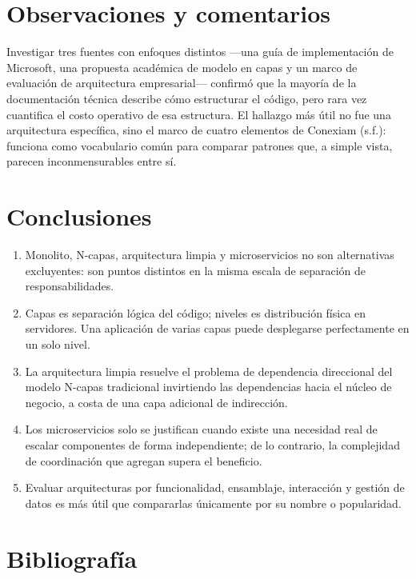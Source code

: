 \documentclass[
  spanish,
  12pt,
  letterpaper,
]{article}
\providecommand{\tightlist}{%
  \setlength{\itemsep}{0pt}\setlength{\parskip}{0pt}}
\begin{document}
\section{Observaciones y comentarios}\label{observaciones-y-comentarios}

Investigar tres fuentes con enfoques distintos ---una guía de
implementación de Microsoft, una propuesta académica de modelo en capas
y un marco de evaluación de arquitectura empresarial--- confirmó que la
mayoría de la documentación técnica describe cómo estructurar el código,
pero rara vez cuantifica el costo operativo de esa estructura. El
hallazgo más útil no fue una arquitectura específica, sino el marco de
cuatro elementos de Conexiam (s.f.): funciona como vocabulario común
para comparar patrones que, a simple vista, parecen inconmensurables
entre sí.

\section{Conclusiones}\label{conclusiones}

\begin{enumerate}
\def\labelenumi{\arabic{enumi}.}
\tightlist
\item
  Monolito, N-capas, arquitectura limpia y microservicios no son
  alternativas excluyentes: son puntos distintos en la misma escala de
  separación de responsabilidades.
\item
  Capas es separación lógica del código; niveles es distribución física
  en servidores. Una aplicación de varias capas puede desplegarse
  perfectamente en un solo nivel.
\item
  La arquitectura limpia resuelve el problema de dependencia direccional
  del modelo N-capas tradicional invirtiendo las dependencias hacia el
  núcleo de negocio, a costa de una capa adicional de indirección.
\item
  Los microservicios solo se justifican cuando existe una necesidad real
  de escalar componentes de forma independiente; de lo contrario, la
  complejidad de coordinación que agregan supera el beneficio.
\item
  Evaluar arquitecturas por funcionalidad, ensamblaje, interacción y
  gestión de datos es más útil que compararlas únicamente por su nombre
  o popularidad.
\end{enumerate}

\section{Bibliografía}\label{bibliografuxeda}
\end{document}
